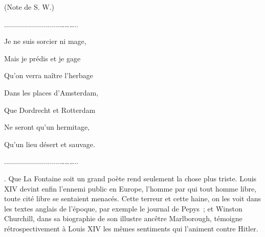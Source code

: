 \documentclass[french,twoside]{book} %
\begin{document}
{(Note de S. W.)\par
............................………..\par
Je ne suis sorcier ni mage,\par
Mais je prédis et je gage\par
Qu'on verra naître l'herbage\par
Dans les places d'Amsterdam,\par
Que Dordrecht et Rotterdam\par
Ne seront qu'un hermitage,\par
Qu'un lieu désert et sauvage.\par
............................………..
}. Que La Fontaine soit un grand poète rend seulement la chose plus triste. Louis XIV devint enfin l'ennemi public en Europe, l'homme par qui tout homme libre, toute cité libre se sentaient menacés. Cette terreur et cette haine, on les voit dans les textes anglais de l'époque, par exemple le journal de Pepys ; et Winston Churchill, dans sa biographie de son illustre ancêtre Marlborough, témoigne rétrospectivement à Louis XIV les mêmes sentiments qui l'animent contre Hitler.\par
\end{document}
